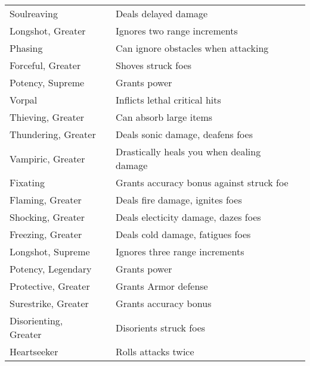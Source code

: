 \begin{longtabuwrapper}
\begin{longtabu}{l l X l}
Soulreaving &  & Deals delayed damage & \pageref{item:Soulreaving} \\
Longshot, Greater &  & Ignores two range increments & \pageref{item:Longshot, Greater} \\
Phasing &  & Can ignore obstacles when attacking & \pageref{item:Phasing} \\
Forceful, Greater &  & Shoves struck foes & \pageref{item:Forceful, Greater} \\
Potency, Supreme &  & Grants  power & \pageref{item:Potency, Supreme} \\
Vorpal &  & Inflicts lethal critical hits & \pageref{item:Vorpal} \\
Thieving, Greater &  & Can absorb large items & \pageref{item:Thieving, Greater} \\
Thundering, Greater &  & Deals sonic damage, deafens foes & \pageref{item:Thundering, Greater} \\
Vampiric, Greater &  & Drastically heals you when dealing damage & \pageref{item:Vampiric, Greater} \\
Fixating &  & Grants accuracy bonus against struck foe & \pageref{item:Fixating} \\
Flaming, Greater &  & Deals fire damage, ignites foes & \pageref{item:Flaming, Greater} \\
Shocking, Greater &  & Deals electicity damage, dazes foes & \pageref{item:Shocking, Greater} \\
Freezing, Greater &  & Deals cold damage, fatigues foes & \pageref{item:Freezing, Greater} \\
Longshot, Supreme &  & Ignores three range increments & \pageref{item:Longshot, Supreme} \\
Potency, Legendary &  & Grants  power & \pageref{item:Potency, Legendary} \\
Protective, Greater &  & Grants  Armor defense & \pageref{item:Protective, Greater} \\
Surestrike, Greater &  & Grants  accuracy bonus & \pageref{item:Surestrike, Greater} \\
Disorienting, Greater &  & Disorients struck foes & \pageref{item:Disorienting, Greater} \\
Heartseeker &  & Rolls attacks twice & \pageref{item:Heartseeker} \\
\end{longtabu}
\end{longtabuwrapper}
